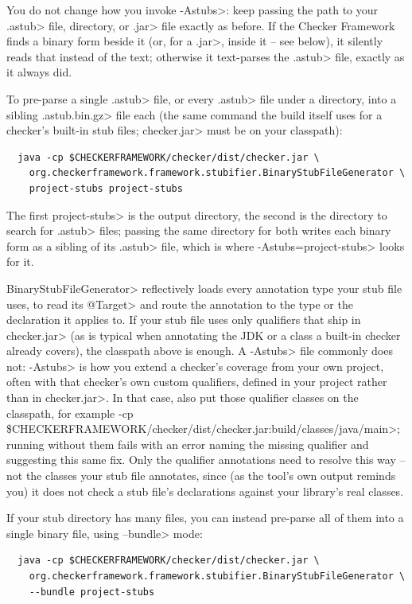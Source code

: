You do not change how you invoke \<-Astubs>: keep passing the path to your
\<.astub> file, directory, or \<.jar> file exactly as before.  If the Checker
Framework finds a binary form beside it (or, for a \<.jar>, inside it -- see
below), it silently reads that instead of the text; otherwise it text-parses
the \<.astub> file, exactly as it always did.

To pre-parse a single \<.astub> file, or every \<.astub> file under a
directory, into a sibling \<.astub.bin.gz> file each (the same command the
build itself uses for a checker's built-in stub files; \<checker.jar> must be
on your classpath):

\begin{Verbatim}
  java -cp $CHECKERFRAMEWORK/checker/dist/checker.jar \
    org.checkerframework.framework.stubifier.BinaryStubFileGenerator \
    project-stubs project-stubs
\end{Verbatim}

\noindent
The first \<project-stubs> is the output directory, the second is the
directory to search for \<.astub> files; passing the same directory for both
writes each binary form as a sibling of its \<.astub> file, which is where
\<-Astubs=project-stubs> looks for it.

\<BinaryStubFileGenerator> reflectively loads every annotation type your stub
file uses, to read its \<@Target> and route the annotation to the type or the
declaration it applies to.  If your stub file uses only qualifiers that ship
in \<checker.jar> (as is typical when annotating the JDK or a class a
built-in checker already covers), the classpath above is enough.  A
\<-Astubs> file commonly does not: \<-Astubs> is how you extend a checker's
coverage from your own project, often with that checker's own custom
qualifiers, defined in your project rather than in \<checker.jar>.  In that
case, also put those qualifier classes on the classpath, for example \<-cp
\$CHECKERFRAMEWORK/checker/dist/checker.jar:build/classes/java/main>; running
without them fails with an error naming the missing qualifier and suggesting
this same fix.  Only the qualifier annotations need to resolve this way --
not the classes your stub file annotates, since (as the tool's own output
reminds you) it does not check a stub file's declarations against your
library's real classes.

If your stub directory has many files, you can instead pre-parse all of them
into a single binary file, using \<--bundle> mode:

\begin{Verbatim}
  java -cp $CHECKERFRAMEWORK/checker/dist/checker.jar \
    org.checkerframework.framework.stubifier.BinaryStubFileGenerator \
    --bundle project-stubs
\end{Verbatim}

